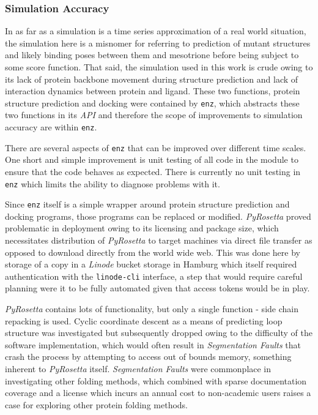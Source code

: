\documentclass[16pt]{book}
\begin{document}
\subsubsection{Simulation Accuracy}
In as far as a simulation is a time series approximation of a real world situation, the simulation here is a misnomer for referring to prediction of mutant structures and likely binding poses between them and mesotrione before being subject to some score function.
That said, the simulation used in this work is crude owing to its lack of protein backbone movement during structure prediction and lack of interaction dynamics between protein and ligand.
These two functions, protein structure prediction and docking were contained by \texttt{enz}, which abstracts these two functions in its \textit{API} and therefore the scope of improvements to simulation accuracy are within \texttt{enz}.

There are several aspects of \texttt{enz} that can be improved over different time scales.
One short and simple improvement is unit testing of all code in the module to ensure that the code behaves as expected.
There is currently no unit testing in \texttt{enz} which limits the ability to diagnose problems with it.

Since \texttt{enz} itself is a simple wrapper around protein structure prediction and docking programs, those programs can be replaced or modified.
\textit{PyRosetta} proved problematic in deployment owing to its licensing and package size, which necessitates distribution of \textit{PyRosetta} to target machines via direct file transfer as opposed to download directly from the world wide web.
This was done here by storage of a copy in a \textit{Linode} bucket storage in Hamburg which itself required authentication with the \texttt{linode-cli} interface, a step that would require careful planning were it to be fully automated given that access tokens would be in play.

\textit{PyRosetta} contains lots of functionality, but only a single function - side chain repacking \cite{dunbrack1993backbone} is used. 
Cyclic coordinate descent as a means of predicting loop structure \cite{canutescu2003cyclic} was investigated but subsequently dropped owing to the difficulty of the software implementation, which would often result in \textit{Segmentation Faults} that crash the process by attempting to access out of bounds memory, something inherent to \textit{PyRosetta} itself.
\textit{Segmentation Faults} were commonplace in investigating other folding methods, which combined with sparse documentation coverage and a license which incurs an annual cost to non-academic users raises a case for exploring other protein folding methods.
\end{document}
